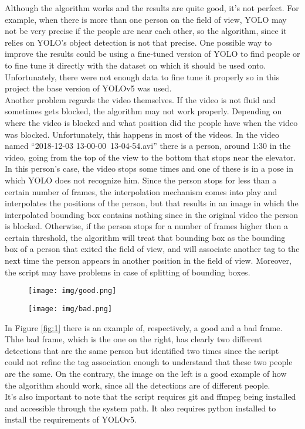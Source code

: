 \documentclass[conference]{IEEEtran}
\begin{document}
		Although the algorithm works and the results are quite good, it's not perfect. For example, when there is more than one person on the field of view,
		YOLO may not be very precise if the people are near each other, so the algorithm, since it relies on YOLO's object detection is not that precise. 
		One possible way to improve the results could be using a fine-tuned version of YOLO to find people or to fine tune it directly with the dataset on which 
		it should be used onto. Unfortunately, there were not enough data to fine tune it properly so in this project the base version of YOLOv5 was used.\\
		Another problem regards the video themselves. If the video is not fluid and sometimes gets blocked, the algorithm may not work properly.
		Depending on where the video is blocked and what position did the people have when the video was blocked. Unfortunately, this happens in most of the videos.
		In the video named ``2018-12-03 13-00-00~13-04-54.avi'' there is a person, around 1:30 in the video, going from the top of the view to the bottom that stops 
		near the elevator. In this person's case, the video stops some times and one of these is in a pose in which YOLO does not recognize him. Since the person 
		stops for less than a certain number of frames, the interpolation mechanism comes into play and interpolates the positions of the person, but that results 
		in an image in which the interpolated bounding box contains nothing since in the original video the person is blocked. Otherwise, if the person stops for a 
		number of frames higher then a certain threshold, the algorithm will treat that bounding box as the bounding box of a person that exited the field 
		of view, and will associate another tag to the next time the person appears in another position in the field of view. Moreover, the script may have problems in
		case of splitting of bounding boxes.
		\begin{figure*}[!ht]
			\centering
			\begin{subfigure}[!ht]{0.48\linewidth}
				\centerline{\texttt{[image: img/good.png]}}
			\end{subfigure}
			\begin{subfigure}[!ht]{0.48\linewidth}
				\centerline{\texttt{[image: img/bad.png]}}
			\end{subfigure}
			\caption{Example of edge detection}
			\label{fig:1}
		\end{figure*}
		In Figure \ref{fig:1} there is an example of, respectively, a good and a bad frame. Thhe bad frame, which is the one on the right, has clearly two different 
		detections that are the same person but identified two times since the script could not refine the tag association enough to understand that these two people 
		are the same. On the contrary, the image on the left is a good example of how the algorithm should work, since all the detections are of different people.\\
		It's also important to note that the script requires git and ffmpeg being installed and accessible through the system path. It also requires python installed 
		to install the requirements of YOLOv5.
	
	\newpage
	\nocite{*}
	\printbibliography
\end{document}
